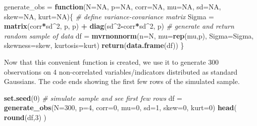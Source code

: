 \documentclass[
  man,floatsintext]{apa6}
\newenvironment{Shaded}{\begin{snugshade}}{\end{snugshade}}
\newcommand{\AttributeTok}[1]{\textcolor[rgb]{0.13,0.29,0.53}{#1}}
\newcommand{\CommentTok}[1]{\textcolor[rgb]{0.56,0.35,0.01}{\textit{#1}}}
\newcommand{\ConstantTok}[1]{\textcolor[rgb]{0.56,0.35,0.01}{#1}}
\newcommand{\ControlFlowTok}[1]{\textcolor[rgb]{0.13,0.29,0.53}{\textbf{#1}}}
\newcommand{\DecValTok}[1]{\textcolor[rgb]{0.00,0.00,0.81}{#1}}
\newcommand{\FunctionTok}[1]{\textcolor[rgb]{0.13,0.29,0.53}{\textbf{#1}}}
\newcommand{\NormalTok}[1]{#1}
\newcommand{\OtherTok}[1]{\textcolor[rgb]{0.56,0.35,0.01}{#1}}
\newcommand{\SpecialCharTok}[1]{\textcolor[rgb]{0.81,0.36,0.00}{\textbf{#1}}}
\begin{document}
\begin{Shaded}
\begin{Highlighting}[]
\NormalTok{generate\_obs }\OtherTok{=} \ControlFlowTok{function}\NormalTok{(}\AttributeTok{N=}\ConstantTok{NA}\NormalTok{, }\AttributeTok{p=}\ConstantTok{NA}\NormalTok{, }\AttributeTok{corr=}\ConstantTok{NA}\NormalTok{, }\AttributeTok{mu=}\ConstantTok{NA}\NormalTok{, }\AttributeTok{sd=}\ConstantTok{NA}\NormalTok{, }\AttributeTok{skew=}\ConstantTok{NA}\NormalTok{, }\AttributeTok{kurt=}\ConstantTok{NA}\NormalTok{)\{}
    \CommentTok{\# define variance{-}covariance matrix}
\NormalTok{    Sigma }\OtherTok{=} \FunctionTok{matrix}\NormalTok{(corr}\SpecialCharTok{*}\NormalTok{sd}\SpecialCharTok{\^{}}\DecValTok{2}\NormalTok{, p, p) }\SpecialCharTok{+} \FunctionTok{diag}\NormalTok{(sd}\SpecialCharTok{\^{}}\DecValTok{2}\SpecialCharTok{{-}}\NormalTok{corr}\SpecialCharTok{*}\NormalTok{sd}\SpecialCharTok{\^{}}\DecValTok{2}\NormalTok{, p)}
    \CommentTok{\# generate and return random sample of data}
\NormalTok{    df }\OtherTok{=} \FunctionTok{mvrnonnorm}\NormalTok{(}\AttributeTok{n=}\NormalTok{N, }\AttributeTok{mu=}\FunctionTok{rep}\NormalTok{(mu,p), }\AttributeTok{Sigma=}\NormalTok{Sigma, }\AttributeTok{skewness=}\NormalTok{skew, }\AttributeTok{kurtosis=}\NormalTok{kurt)}
    \FunctionTok{return}\NormalTok{(}\FunctionTok{data.frame}\NormalTok{(df))}
\NormalTok{\}}
\end{Highlighting}
\end{Shaded}

Now that this convenient function is created, we use it to generate 300 observations on 4 non-correlated variables/indicators distributed as standard Gaussians. The code ends showing the first few rows of the simulated sample.

\begin{Shaded}
\begin{Highlighting}[]
\FunctionTok{set.seed}\NormalTok{(}\DecValTok{0}\NormalTok{)}
\CommentTok{\# simulate sample and see first few rows}
\NormalTok{df }\OtherTok{=} \FunctionTok{generate\_obs}\NormalTok{(}\AttributeTok{N=}\DecValTok{300}\NormalTok{, }\AttributeTok{p=}\DecValTok{4}\NormalTok{, }\AttributeTok{corr=}\DecValTok{0}\NormalTok{, }\AttributeTok{mu=}\DecValTok{0}\NormalTok{, }\AttributeTok{sd=}\DecValTok{1}\NormalTok{, }\AttributeTok{skew=}\DecValTok{0}\NormalTok{, }\AttributeTok{kurt=}\DecValTok{0}\NormalTok{)}
\FunctionTok{head}\NormalTok{( }\FunctionTok{round}\NormalTok{(df,}\DecValTok{3}\NormalTok{) )}
\end{Highlighting}
\end{Shaded}
\end{document}
